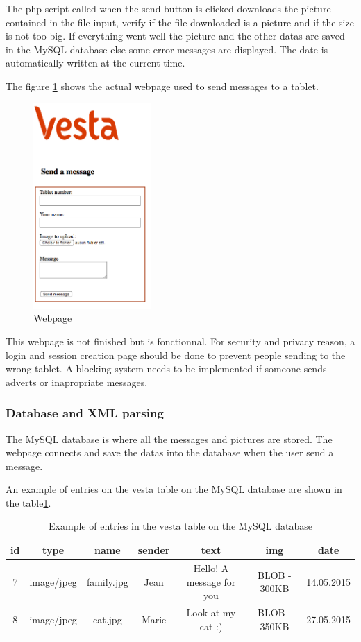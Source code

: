 The php script called when the send button is clicked downloads the picture contained in the file input, verify if the file downloaded is a picture and if the size is not too big. If everything went well the picture and the other datas are saved in the MySQL database else some error messages are displayed. The date is automatically written at the current time.

The figure \ref{fig:webpage} shows the actual webpage used to send messages to a tablet.
\begin{figure}[!htb]
    \centering
    \includegraphics[width=0.4\textwidth,keepaspectratio]{chap/softFig/web_front_page.png}
    \caption{Webpage}
    \label{fig:webpage}
\end{figure}

This webpage is not finished but is fonctionnal. For security and privacy reason, a login and session creation page should be done to prevent people sending to the wrong tablet. A blocking system needs to be implemented if someone sends adverts or inapropriate messages.

\clearpage

\subsubsection{Database and XML parsing}
The MySQL database is where all the messages and pictures are stored. The webpage connects and save the datas into the database when the user send a message.

An example of entries on the vesta table on the MySQL database are shown in the table\ref{tab:database}.

\begin{table}
\begin{tabular}{|c|c|c|c|c|c|c|}
  \hline
  id & type & name & sender & text & img & date \\
  \hline
  7 & image/jpeg & family.jpg & Jean & Hello! A message for you & BLOB - 300KB & 14.05.2015\\
  8 & image/jpeg & cat.jpg & Marie & Look at my cat :) & BLOB - 350KB & 27.05.2015\\
  \hline
\end{tabular}
\caption {Example of entries in the vesta table on the MySQL database}\label{tab:database}
\end{table}


